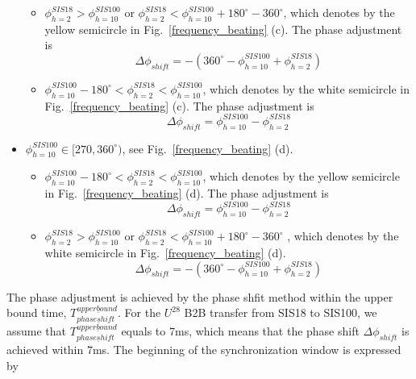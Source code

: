 \begin{itemize}
	\begin{itemize}
		\item $\phi_{h=2}^{SIS18} > \phi_{h=10}^{SIS100}$ or  $\phi_{h=2}^{SIS18} < \phi_{h=10}^{SIS100} +180^\circ - 360^\circ $, which denotes by the yellow semicircle in Fig.~\ref{frequency_beating} (c). The phase adjustment is
    \begin{equation}			
\Delta \phi_{shift}=-(360^\circ - \phi_{h=10}^{SIS100}+ \phi_{h=2}^{SIS18})
    \end{equation}
    		\item $\phi_{h=10}^{SIS100}-180^\circ < \phi_{h=2}^{SIS18}< \phi_{h=10}^{SIS100}$, which denotes by the white semicircle in Fig.~\ref{frequency_beating} (c). The phase adjustment is
    \begin{equation}			
\Delta \phi_{shift}=\phi_{h=10}^{SIS100}-\phi_{h=2}^{SIS18}
    \end{equation}
	\end{itemize}
    \item $\phi_{h=10}^{SIS100}\in [270,360^\circ)$, see Fig.~\ref{frequency_beating} (d).

	\begin{itemize}
		\item $\phi_{h=10}^{SIS100}-180^\circ < \phi_{h=2}^{SIS18}< \phi_{h=10}^{SIS100}$, which denotes by the yellow semicircle in Fig.~\ref{frequency_beating} (d). The phase adjustment is 
	    \begin{equation}	
\Delta \phi_{shift}=\phi_{h=10}^{SIS100}-\phi_{h=2}^{SIS18}	
    \end{equation}
    		\item $\phi_{h=2}^{SIS18} > \phi_{h=10}^{SIS100}$ or  $\phi_{h=2}^{SIS18} < \phi_{h=10}^{SIS100} +180^\circ - 360^\circ $ , which denotes by the white semicircle in Fig.~\ref{frequency_beating} (d). 
    \begin{equation}			
\Delta \phi_{shift}=-(360^\circ - \phi_{h=10}^{SIS100}+ \phi_{h=2}^{SIS18})
    \end{equation}
	\end{itemize}
\end{itemize}

The phase adjustment is achieved by the phase shfit method within the upper bound time, $T_{phase\underline shift}^{upper\underline bound}$. For the $U^{28}$ B2B transfer from SIS18 to SIS100, we assume that $T_{phase\underline shift}^{upper\underline bound}$ equals to 7ms, which means that the phase shift $\Delta \phi_{shift}$ is achieved within 7ms.  The beginning of the synchronization window is expressed by 

